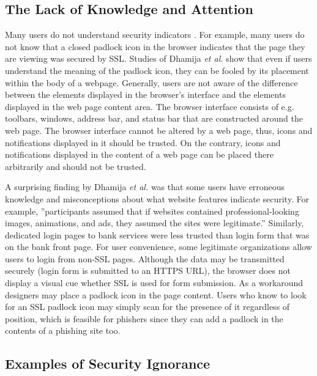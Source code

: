 \documentclass{tktltiki}
\begin{document}
          

      
    
\subsection{The Lack of Knowledge and Attention}

    Many users do not understand security indicators \cite{why_phishing_works_06}. For example, many users do not know that a closed padlock icon in the browser indicates that the page they are viewing was secured by SSL. Studies of Dhamija \emph{et al.} \cite{why_phishing_works_06} show that even if users understand the meaning of the padlock icon, they can be fooled by its placement within the body of a webpage. Generally, users are not aware of the difference between the elements displayed in the browser's interface and the elements displayed in the web page content area. The browser interface consists of e.g. toolbars, windows, address bar, and status bar that are constructed around the web page. The browser interface cannot be altered by a web page, thus, icons and notifications displayed in it should be trusted. On the contrary, icons and notifications displayed in the content of a web page can be placed there arbitrarily and should not be trusted.
        
        A surprising finding by Dhamija \emph{et al.} \cite{why_phishing_works_06} was that some users have erroneous knowledge and misconceptions about what website features indicate security. For example, ''participants assumed that if websites contained professional-looking images, animations, and ads, they assumed the sites were legitimate.'' Similarly, dedicated login pages to bank services were less trusted than login form that was on the bank front page. For user convenience, some legitimate organizations allow users to login from non-SSL pages. Although the data may be transmitted securely (login form is submitted to an HTTPS URL), the browser does not display a visual cue whether SSL is used for form submission. As a workaround designers may place a padlock icon in the page content. Users who know to look for an SSL padlock icon may simply scan for the presence of it regardless of position, which is feasible for phishers since they can add a padlock in the contents of a phishing site too.
        
    
\subsection{Examples of Security Ignorance}
\end{document}
